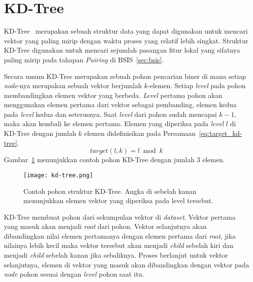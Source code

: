 \section{KD-Tree}
\label{sec:kdtree}
KD-Tree~\cite{bentley1975multidimensional} merupakan sebuah struktur data yang dapat digunakan untuk mencari vektor yang paling mirip dengan waktu proses yang relatif lebih singkat. Struktur KD-Tree digunakan untuk mencari sejumlah pasangan fitur lokal yang sifatnya paling mirip pada tahapan \textit{Pairing} di BSIS~\ref{sec:bsis}. 

Secara umum KD-Tree merupakan sebuah pohon pencarian biner di mana setiap \textit{node}-nya merupakan sebuah vektor berjumlah $k$-elemen. Setiap \textit{level} pada pohon membandingkan elemen vektor yang berbeda. \textit{Level} pertama pohon akan menggunakan elemen pertama dari vektor sebagai pembanding, elemen kedua pada \textit{level} kedua dan seterusnya. Saat \textit{level} dari pohon sudah mencapai $k - 1$, maka akan kembali ke elemen pertama. Elemen yang diperiksa pada \textit{level} $l$ di KD-Tree dengan jumlah $k$ elemen didefinisikan pada Persamaan~\ref{eq:target_kd-tree}.
\vspace{-4px}
\begin{equation}
	\label{eq:target_kd-tree}
	target(l, k) = l\bmod k
\end{equation}
Gambar~\ref{fig:kd-tree} menunjukkan contoh pohon KD-Tree dengan jumlah 3 elemen.
\begin{figure}[H]
	\centering
	\texttt{[image: kd-tree.png]}
	\caption{Contoh pohon struktur KD-Tree. Angka di sebelah kanan menunjukkan elemen vektor yang diperiksa pada level tersebut.}
	\label{fig:kd-tree}
\end{figure}

KD-Tree membuat pohon dari sekumpulan vektor di \textit{dataset}. Vektor pertama yang masuk akan menjadi \textit{root} dari pohon. Vektor selanjutnya akan dibandingkan nilai elemen pertamanya dengan elemen pertama dari \textit{root}, jika nilainya lebih kecil maka vektor tersebut akan menjadi \textit{child} sebelah kiri dan menjadi \textit{child} sebelah kanan jika sebaliknya. Proses berlanjut untuk vektor selanjutnya, elemen di vektor yang masuk akan dibandingkan dengan vektor pada \textit{node} pohon sesuai dengan \textit{level} pohon saat itu. 

